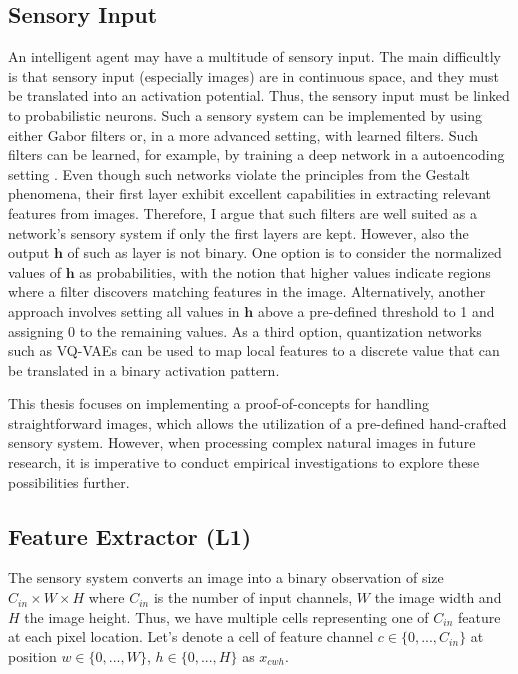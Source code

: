 \subsection{Sensory Input}
An intelligent agent may have a multitude of sensory input. The main difficultly is that sensory input (especially images) are in continuous space, and they must be translated into an activation potential.
Thus, the sensory input must be linked to probabilistic neurons. Such a sensory system can be implemented by using either Gabor filters  or, in a more advanced setting, with learned filters.
Such filters can be learned, for example, by training a deep network in a autoencoding setting . Even though such networks violate the principles from the Gestalt phenomena, their first layer exhibit excellent capabilities in extracting relevant features from images. Therefore, I argue that such filters are well suited as a network's sensory system if only the first layers are kept. However, also the output $\boldsymbol{h}$ of such as layer is not binary.
One option is to consider the normalized values of $\boldsymbol{h}$ as probabilities, with the notion that higher values indicate regions where a filter discovers matching features in the image. Alternatively, another approach involves setting all values in $\boldsymbol{h}$ above a pre-defined threshold to 1 and assigning 0 to the remaining values.
As a third option, quantization networks such as VQ-VAEs  can be used to map local features to a discrete value that can be translated in a binary activation pattern.

This thesis focuses on implementing a proof-of-concepts for handling straightforward images, which allows the utilization of a pre-defined hand-crafted sensory system. However, when processing complex natural images in future research, it is imperative to conduct empirical investigations to explore these possibilities further.

\subsection{Feature Extractor (L1)}
The sensory system converts an image into a binary observation of size $C_{in} \times W \times H$ where $C_{in}$ is the number of input channels, $W$ the image width and $H$ the image height. Thus, we have multiple cells representing one of $C_{in}$ feature at each pixel location. Let's denote a cell of feature channel $c \in \{0, ..., C_{in}\}$ at position $w \in \{0, ..., W\}$, $h \in \{0, ..., H\}$ as $x_{cwh}$. 





